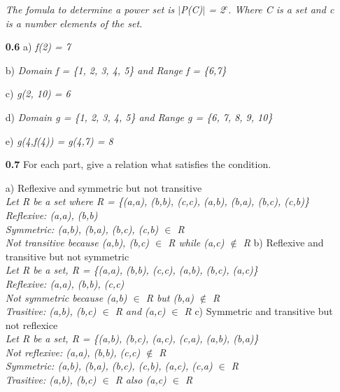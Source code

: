 \documentclass[12pt]{letter}
\begin{document}
\begin{enumerate}
\setlength{\parindent}{0ex} \textit{The fomula to determine a power set is $|$P(C)$|$ = 2$^c$. Where C is a set and \textit{c} is a number elements of the set. } 
\setlength{\parindent}{0ex}

\item[\textbf{0.6}]
	a) \textit{f(2) = 7}

	b) \textit{Domain f = \{1, 2, 3, 4, 5\} and Range f = \{6,7\}}

	c) \textit{\textit{g(2, 10) = 6}}

	d) \textit{Domain g = \{1, 2, 3, 4, 5\} and Range g = \{6, 7, 8, 9, 10\}}

	e) \textit{g(4,f(4)) = g(4,7) = 8}

\newpage

\item[\textbf{0.7}] For each part, give a relation what satisfies the condition.
	
	a) Reflexive and symmetric but not transitive \\
		\setlength{\parindent}{5ex} \textit{Let R be a set where R = \{(a,a), (b,b), (c,c), (a,b), (b,a), (b,c), (c,b)\}} \\
		\setlength{\parindent}{10ex} \textit{Reflexive: (a,a), (b,b) } \\
		\setlength{\parindent}{10ex} \textit{Symmetric: (a,b), (b,a), (b,c), (c,b) $\in$ R} \\
		\setlength{\parindent}{10ex} \textit{Not transitive because (a,b), (b,c) $\in$ R while (a,c) $\notin$ R}
		\setlength{\parindent}{0ex} 
	\newline
	\newline
	b) Reflexive and transitive but not symmetric \\
		\setlength{\parindent}{5ex} \textit{Let R be a set, R = \{(a,a), (b,b), (c,c), (a,b), (b,c), (a,c)\}} \\
		\setlength{\parindent}{10ex} \textit{Reflexive: (a,a), (b,b), (c,c) } \\
		\setlength{\parindent}{10ex} \textit{Not symmetric because (a,b) $\in$ R but (b,a) $\notin$ R} \\
		\setlength{\parindent}{10ex} \textit{Trasitive: (a,b), (b,c) $\in$ R and (a,c) $\in$ R }
		\setlength{\parindent}{0ex}
	\newline
	\newline
	c) Symmetric and transitive but not reflexice \\
		\setlength{\parindent}{5ex} \textit{Let R be a set, R = \{(a,b), (b,c), (a,c), (c,a), (a,b), (b,a)\}} \\
		\setlength{\parindent}{10ex} \textit{Not reflexive: (a,a), (b,b), (c,c) $\notin$ R} \\
		\setlength{\parindent}{10ex} \textit{Symmetric: (a,b), (b,a), (b,c), (c,b), (a,c), (c,a) $\in$ R} \\
		\setlength{\parindent}{10ex} \textit{Trasitive: (a,b), (b,c) $\in$ R also (a,c) $\in$ R }
		\setlength{\parindent}{0ex}



\end{enumerate}
\end{document}
